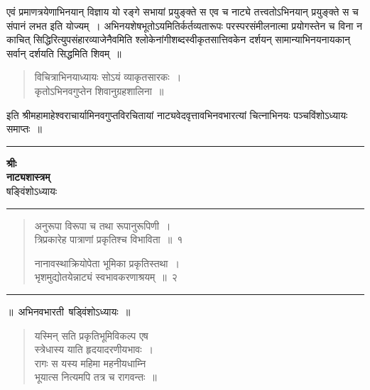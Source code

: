 \documentclass[11pt, openany]{book}
\begin{document}
एवं प्रमाणत्रयेणाभिनयान् विज्ञाय यो रङ्गे सभायां प्रयुङ्क्ते स एव च नाट्ये तत्त्वतोऽभिनयान् प्रयुङ्क्ते स च संपानं लभत इति योज्यम्~। अभिनयशेषभूतोऽयमितिर्कर्तव्यतारूपः परस्परसंमीलनात्मा प्रयोगस्तेन च विना न काचित् सिद्धिरित्युपसंहारव्याजेनैवमिति श्लोकेनांगीशब्दस्वीकृतसात्तिवकेन दर्शयन् सामान्याभिनयनायकान् सर्वान् दर्शयति सिद्धमिति शिवम्~॥

\begin{quote}
{\qt विचित्राभिनयाध्यायः सोऽयं व्याकृतसारकः~।\\
कृतोऽभिनवगुप्तेन शिवानुग्रहशालिना~॥}
\end{quote}

\begin{center}
इति श्रीमहामाहेश्वराचार्यामिनवगुप्तविरचितायां नाट्यवेदवृत्तावभिनवभारत्यां चित्नाभिनयः पञ्चविंशोऽध्यायः समाप्तः~॥\\

\vspace{2mm}
\rule{0.2\linewidth}{0.5pt}
\end{center}

\newpage
\thispagestyle{empty}
\begin{center}
\textbf{\large श्रीः}\\

\vspace{2mm}
\textbf{\huge नाट्यशास्त्रम्}\\

\vspace{2mm}
षङ्विंशोऽध्यायः

\vspace{2mm}
\rule{0.2\linewidth}{0.5pt}
\end{center}

\begin{quote}
{\na अनुरूपा विरूपा च तथा रूपानुरूपिणी~।\\
त्रिप्रकारेह पात्राणां प्रकृतिश्च विभाविता~॥~१

नानावस्थाक्रियोपेता भूमिका प्रकृतिस्तथा~।\\
भृशमुद्योतयेन्नाट्यं स्वभावकरणाश्रयम्~॥~२}
\end{quote}

\hrule

\begin{center}
॥~अभिनवभारती\textendash\ षड्विंशोऽध्यायः~॥
\end{center}

\begin{quote}
{\qt यस्मिन् सति प्रकृतिभूमिविकल्प एष\\
स्त्रेधास्य याति हृदयादरणीयभावः~।\\
रागः स यस्य महिमा महनीयधाम्नि\\
भूयात्स नित्यमपि तत्र च रागवन्तः~॥}
\end{quote}
\end{document}
